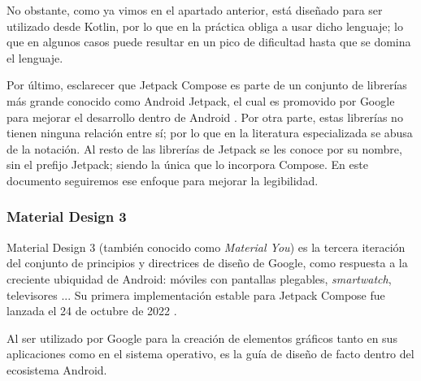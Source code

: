            No obstante, como ya vimos en el apartado anterior, está diseñado para ser utilizado desde Kotlin, por lo 
            que en la práctica obliga a usar dicho lenguaje; lo que en algunos casos puede resultar en un pico de 
            dificultad hasta que se domina el lenguaje.
            
            Por último, esclarecer que Jetpack Compose es parte de un conjunto de librerías más grande conocido como 
            Android Jetpack, el cual es promovido por Google para mejorar el desarrollo dentro de Android 
            \cite{huaman_que_2018} \cite{noauthor_recursos_nodate}. Por otra
            parte, estas librerías no tienen ninguna relación entre sí; por lo que en la literatura especializada se 
            abusa de la notación. Al resto de las librerías de Jetpack se les conoce
            por su nombre, sin el prefijo Jetpack; siendo la única que lo incorpora Compose. En este documento 
            seguiremos ese enfoque para mejorar la legibilidad.
            
        \subsubsection{Material Design 3}
            Material Design 3 (también conocido como \textit{Material You}) es la tercera iteración del 
            conjunto de principios y directrices de diseño de Google, 
            como respuesta a la creciente ubiquidad de Android: móviles con pantallas
            plegables, \textit{smartwatch}, televisores \cite{ramirez_que_2022}... 
            Su primera implementación estable para Jetpack Compose fue lanzada el 
            24 de octubre de 2022 \cite{singh_material_2022}.
            
            Al ser utilizado por Google para la creación de elementos 
            gráficos tanto en sus aplicaciones como en el sistema operativo, es la guía de diseño de facto dentro del
            ecosistema Android.

